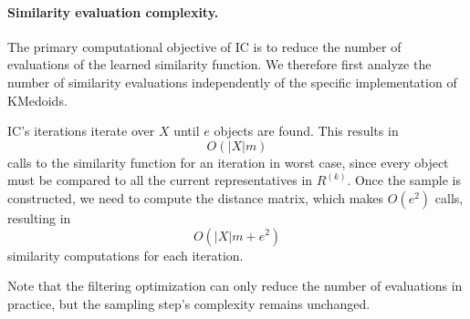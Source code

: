 \documentclass{ieeeaccess}
\newcommand{\toblack}{\color{black}}
\newcommand{\tored}{\color{red}}
\newcommand{\pk}[1]{{\tored [{\bfseries Pierre}: {\itshape #1}] \toblack}}
\newcommand{\representativeamount}{m}
\newcommand{\kmedoidsalg}{KMedoids\xspace}
\newcommand{\inclusion}{IC\xspace}
\begin{document}

\paragraph*{Similarity evaluation complexity.}

The primary computational objective of \inclusion is to reduce the number of evaluations of the learned similarity function. We therefore first analyze the number of similarity evaluations independently of the specific implementation of \kmedoidsalg.



\inclusion's iterations iterate over $X$ until $e$ objects are found. This results in
\[O(|X|\representativeamount)\] 
calls to the similarity function for an iteration in worst case, since every object must be compared to all the current representatives in $R^{(k)}$. 
Once the sample is constructed, we need to compute the distance matrix, which makes $O(e^2)$ calls, resulting in 
\[O(|X|\representativeamount+e^2)\]
similarity computations for each iteration.

Note that the filtering optimization can only reduce the number of evaluations in practice, but the sampling step's complexity remains unchanged.
\end{document}
